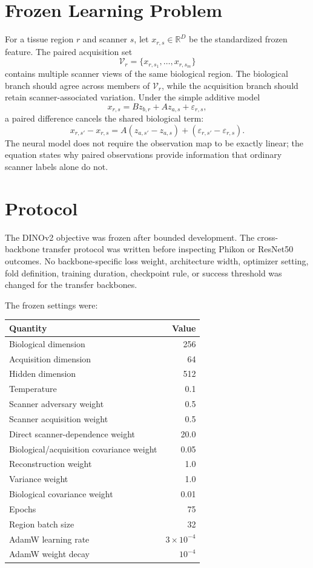 \documentclass[10pt]{article}
\begin{document}
\section{Frozen Learning Problem}
For a tissue region $r$ and scanner $s$, let $x_{r,s}\in\mathbb{R}^{D}$ be the standardized frozen feature. The paired acquisition set
\[
\mathcal{V}_r=\{x_{r,s_1},\ldots,x_{r,s_m}\}
\]
contains multiple scanner views of the same biological region. The biological branch should agree across members of $\mathcal{V}_r$, while the acquisition branch should retain scanner-associated variation. Under the simple additive model
\[
x_{r,s}=Bz_{b,r}+Az_{a,s}+\varepsilon_{r,s},
\]
a paired difference cancels the shared biological term:
\[
x_{r,s'}-x_{r,s}=A(z_{a,s'}-z_{a,s})+(\varepsilon_{r,s'}-\varepsilon_{r,s}).
\]
The neural model does not require the observation map to be exactly linear; the equation states why paired observations provide information that ordinary scanner labels alone do not.



\section{Protocol}
The DINOv2 objective was frozen after bounded development. The cross-backbone transfer protocol was written before inspecting Phikon or ResNet50 outcomes. No backbone-specific loss weight, architecture width, optimizer setting, fold definition, training duration, checkpoint rule, or success threshold was changed for the transfer backbones.

The frozen settings were:
\begin{center}
\small
\begin{tabular}{@{}lr@{}}
\toprule
Quantity & Value \\
\midrule
Biological dimension & 256 \\
Acquisition dimension & 64 \\
Hidden dimension & 512 \\
Temperature & 0.1 \\
Scanner adversary weight & 0.5 \\
Scanner acquisition weight & 0.5 \\
Direct scanner-dependence weight & 20.0 \\
Biological/acquisition covariance weight & 0.05 \\
Reconstruction weight & 1.0 \\
Variance weight & 1.0 \\
Biological covariance weight & 0.01 \\
Epochs & 75 \\
Region batch size & 32 \\
AdamW learning rate & $3\times10^{-4}$ \\
AdamW weight decay & $10^{-4}$ \\
\bottomrule
\end{tabular}
\end{center}
\end{document}
